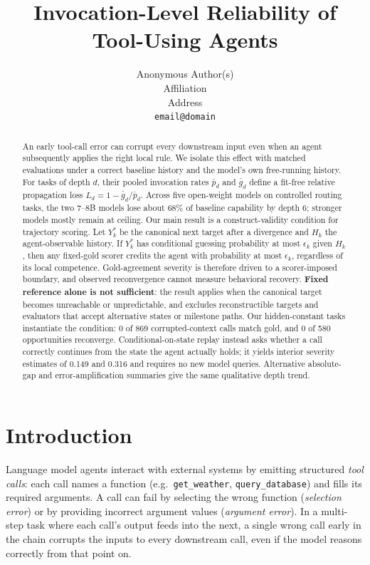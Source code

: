 \documentclass{article}
\title{Invocation-Level Reliability of Tool-Using Agents }
\author{
  Anonymous Author(s) \\
  Affiliation \\
  Address \\
  \texttt{email@domain}
}
\date{}
\begin{document}
\maketitle

\begin{abstract}
An early tool-call error can corrupt every downstream input even when an agent subsequently applies the right local rule. We isolate this effect with matched evaluations under a correct baseline history and the model's own free-running history. For tasks of depth $d$, their pooled invocation rates $\bar p_d$ and $\bar g_d$ define a fit-free relative propagation loss $L_d=1-\bar g_d/\bar p_d$. Across five open-weight models on controlled routing tasks, the two 7--8B models lose about 68\% of baseline capability by depth 6; stronger models mostly remain at ceiling. Our main result is a construct-validity condition for trajectory scoring. Let $Y_k^*$ be the canonical next target after a divergence and $H_k$ the agent-observable history. If $Y_k^*$ has conditional guessing probability at most $\epsilon_k$ given $H_k$, then any fixed-gold scorer credits the agent with probability at most $\epsilon_k$, regardless of its local competence. Gold-agreement severity is therefore driven to a scorer-imposed boundary, and observed reconvergence cannot measure behavioral recovery. \textbf{Fixed reference alone is not sufficient}: the result applies when the canonical target becomes unreachable or unpredictable, and excludes reconstructible targets and evaluators that accept alternative states or milestone paths. Our hidden-constant tasks instantiate the condition: 0 of 869 corrupted-context calls match gold, and 0 of 580 opportunities reconverge. Conditional-on-state replay instead asks whether a call correctly continues from the state the agent actually holds; it yields interior severity estimates of 0.149 and 0.316 and requires no new model queries. Alternative absolute-gap and error-amplification summaries give the same qualitative depth trend.
\end{abstract}

\section{Introduction}

Language model agents interact with external systems by emitting structured \emph{tool calls}: each call names a function (e.g.\ \texttt{get\_weather}, \texttt{query\_database}) and fills its required arguments. A call can fail by selecting the wrong function (\emph{selection error}) or by providing incorrect argument values (\emph{argument error}). In a multi-step task where each call's output feeds into the next, a single wrong call early in the chain corrupts the inputs to every downstream call, even if the model reasons correctly from that point on.
\end{document}
